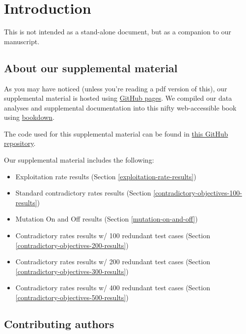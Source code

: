 \documentclass[
]{book}
\providecommand{\tightlist}{%
  \setlength{\itemsep}{0pt}\setlength{\parskip}{0pt}}
\begin{document}
\hypertarget{introduction}{%
\chapter{Introduction}\label{introduction}}

This is not intended as a stand-alone document, but as a companion to our manuscript.

\hypertarget{about-our-supplemental-material}{%
\section{About our supplemental material}\label{about-our-supplemental-material}}

As you may have noticed (unless you're reading a pdf version of this), our supplemental material is hosted using \href{https://pages.github.com/}{GitHub pages}.
We compiled our data analyses and supplemental documentation into this nifty web-accessible book using \href{https://bookdown.org}{bookdown}.

The code used for this supplemental material can be found in \href{https://github.com/jgh9094/GPTP-2024-Lexicase-Analysis}{this GitHub repository}.

Our supplemental material includes the following:

\begin{itemize}
\tightlist
\item
  Exploitation rate results (Section \ref{exploitation-rate-results})
\item
  Standard contradictory rates results (Section \ref{contradictory-objectives-100-results})
\item
  Mutation On and Off results (Section \ref{mutation-on-and-off})
\item
  Contradictory rates results w/ 100 redundant test cases (Section \ref{contradictory-objectives-200-results})
\item
  Contradictory rates results w/ 200 redundant test cases (Section \ref{contradictory-objectives-300-results})
\item
  Contradictory rates results w/ 400 redundant test cases (Section \ref{contradictory-objectives-500-results})
\end{itemize}

\hypertarget{contributing-authors}{%
\section{Contributing authors}\label{contributing-authors}}
\end{document}
